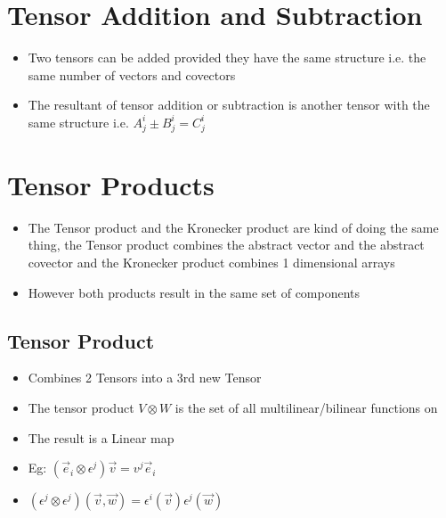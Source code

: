 \section{Tensor Addition and Subtraction}
\begin{itemize}
\item Two tensors can be added provided they have the same structure i.e. the same number of vectors and covectors
\item The resultant of tensor addition or subtraction is another tensor with the same structure i.e. $A^{i}_{j} \pm B^{i}_{j} = C^{i}_{j}$
\end{itemize}

\section{Tensor Products}
\begin{itemize}
	\item The Tensor product and the Kronecker product are kind of doing the same thing, the Tensor product combines the abstract vector and the abstract covector and the Kronecker product combines 1 dimensional arrays
	\item However both products result in the same set of components
\end{itemize}
\subsection{Tensor Product}
\begin{itemize}
\item Combines 2 Tensors into a 3rd new Tensor
\item The tensor product $V \otimes W$ is the set of all multilinear/bilinear functions on
\item The result is a Linear map
\item Eg: $(\vec{e}_{i} \otimes \epsilon^{j})\vec{v} = v^{j}\vec{e}_{i}$
\item $(\epsilon^{j} \otimes \epsilon^{j})(\vec{v}, \vec{w}) = \epsilon^{i}(\vec{v})\epsilon^{j}(\vec{w})$
\end{itemize}
